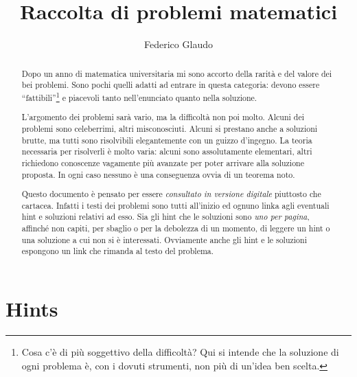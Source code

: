 \documentclass[a4paper,12pt]{article}
\title{Raccolta di problemi matematici}
\author{Federico Glaudo}
\newcounter{ProblemNumber}
\begin{document}
\maketitle

\begin{abstract}
	Dopo un anno di matematica universitaria mi sono accorto della rarità e del valore dei bei problemi. Sono pochi quelli adatti ad entrare in questa categoria: devono essere ``fattibili''\footnote{Cosa c'è di più soggettivo della difficoltà? Qui si intende che la soluzione di ogni problema è, con i dovuti strumenti, non più di un'idea ben scelta.} e piacevoli tanto nell'enunciato quanto nella soluzione.
	
	L'argomento dei problemi sarà vario, ma la difficoltà non poi molto. Alcuni dei problemi sono celeberrimi, altri misconosciuti. Alcuni si prestano anche a soluzioni brutte, ma tutti sono risolvibili elegantemente con un guizzo d'ingegno.
	La teoria necessaria per risolverli è molto varia: alcuni sono assolutamente elementari, altri richiedono conoscenze vagamente più avanzate per poter arrivare alla soluzione proposta. In ogni caso nessuno è una conseguenza ovvia di un teorema noto.

	Questo documento è pensato per essere \emph{consultato in versione digitale} piuttosto che cartacea. 
	Infatti i testi dei problemi sono tutti all'inizio ed ognuno linka agli eventuali hint e soluzioni relativi ad esso. Sia gli hint che le soluzioni sono \emph{uno per pagina}, affinché non capiti, per sbaglio o per la debolezza di un momento, di leggere un hint o una soluzione a cui non si è interessati. Ovviamente anche gli hint e le soluzioni espongono un link che rimanda al testo del problema. 
	
\end{abstract}
\clearpage

\tableofcontents
\clearpage





%
\addtocounter{ProblemNumber}{1}%
%
\section{Hints}
%
%
%
\newpage
%
\end{document}
